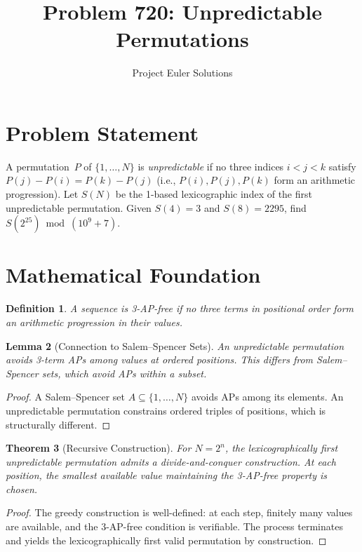 \documentclass[11pt]{article}
\title{Problem 720: Unpredictable Permutations}
\author{Project Euler Solutions}
\date{}
\newtheorem{theorem}{Theorem}
\newtheorem{lemma}[theorem]{Lemma}
\newtheorem{definition}[theorem]{Definition}
\begin{document}
\maketitle

\section{Problem Statement}

A permutation~$P$ of $\{1,\ldots,N\}$ is \emph{unpredictable} if no three indices $i<j<k$ satisfy $P(j)-P(i)=P(k)-P(j)$ (i.e., $P(i),P(j),P(k)$ form an arithmetic progression). Let $S(N)$ be the 1-based lexicographic index of the first unpredictable permutation. Given $S(4)=3$ and $S(8)=2295$, find $S(2^{25}) \bmod (10^9+7)$.

\section{Mathematical Foundation}

\begin{definition}
A sequence is \emph{3-AP-free} if no three terms in positional order form an arithmetic progression in their values.
\end{definition}

\begin{lemma}[Connection to Salem--Spencer Sets]
An unpredictable permutation avoids 3-term APs among values at ordered positions. This differs from Salem--Spencer sets, which avoid APs within a subset.
\end{lemma}

\begin{proof}
A Salem--Spencer set $A \subseteq \{1,\ldots,N\}$ avoids APs among its elements. An unpredictable permutation constrains ordered triples of positions, which is structurally different.
\end{proof}

\begin{theorem}[Recursive Construction]
For $N = 2^n$, the lexicographically first unpredictable permutation admits a divide-and-conquer construction. At each position, the smallest available value maintaining the 3-AP-free property is chosen.
\end{theorem}

\begin{proof}
The greedy construction is well-defined: at each step, finitely many values are available, and the 3-AP-free condition is verifiable. The process terminates and yields the lexicographically first valid permutation by construction.
\end{proof}
\end{document}

